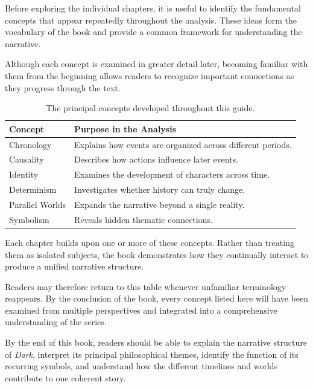 \documentclass[12pt,oneside,openany]{book}
\begin{document}
Before exploring the individual chapters, it is useful to identify the
fundamental concepts that appear repeatedly throughout the analysis. These
ideas form the vocabulary of the book and provide a common framework for
understanding the narrative.

Although each concept is examined in greater detail later, becoming familiar
with them from the beginning allows readers to recognize important
connections as they progress through the text.

\begin{table}[H]
\centering
\begin{tabular}{|p{4cm}|p{8.2cm}|}
\hline
\textbf{Concept} & \textbf{Purpose in the Analysis} \\
\hline
Chronology & Explains how events are organized across different periods.\\
\hline
Causality & Describes how actions influence later events.\\
\hline
Identity & Examines the development of characters across time.\\
\hline
Determinism & Investigates whether history can truly change.\\
\hline
Parallel Worlds & Expands the narrative beyond a single reality.\\
\hline
Symbolism & Reveals hidden thematic connections.\\
\hline
\end{tabular}
\caption{The principal concepts developed throughout this guide.}
\end{table}

Each chapter builds upon one or more of these concepts. Rather than treating
them as isolated subjects, the book demonstrates how they continually interact
to produce a unified narrative structure.

Readers may therefore return to this table whenever unfamiliar terminology
reappears. By the conclusion of the book, every concept listed here will have
been examined from multiple perspectives and integrated into a comprehensive
understanding of the series.

\begin{tcolorbox}[colback=green!5,colframe=green!50!black,title=Learning Objective]
By the end of this book, readers should be able to explain the narrative
structure of \textit{Dark}, interpret its principal philosophical themes,
identify the function of its recurring symbols, and understand how the
different timelines and worlds contribute to one coherent story.
\end{tcolorbox}
\end{document}
